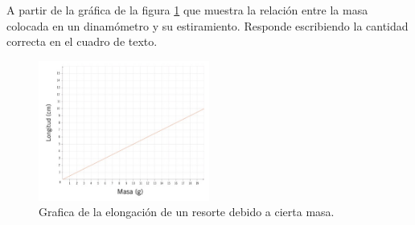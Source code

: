 A partir de la gráfica de la figura \ref{fig:SINMAT1_U3_AC75_IMG1} que muestra la relación entre la masa colocada en un dinamómetro y su estiramiento. Responde escribiendo la cantidad correcta en el cuadro de texto.

\begin{multicols}{2}
    \begin{figure}[H]
        \centering
        \includegraphics[width=0.5\textwidth]{../images/SINMAT1_U3_AC75_IMG1.jpg}
        \caption{Grafica de la elongación de un resorte debido a cierta masa.}
        \label{fig:SINMAT1_U3_AC75_IMG1}
    \end{figure}
    \begin{parts}
       \part 
       \part 
       \part 
       \part 
       \part 
    \end{parts}
\end{multicols}
